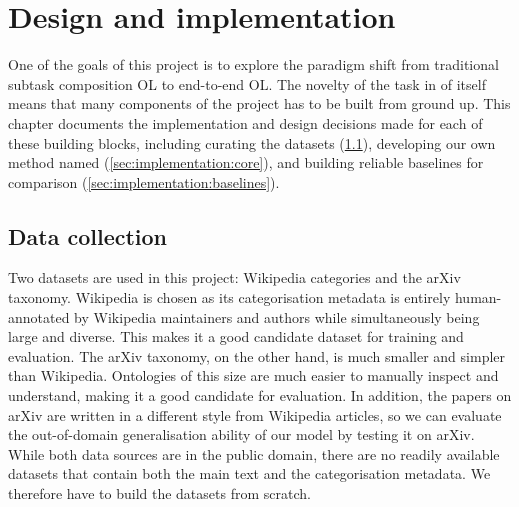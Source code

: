 \chapter{Design and implementation}  \label{chap:implementation}

One of the goals of this project is to explore the paradigm shift from traditional subtask composition OL to end-to-end OL. The novelty of the task in of itself means that many components of the project has to be built from ground up. This chapter documents the implementation and design decisions made for each of these building blocks, including curating the datasets (\cref{sec:implementation:data-collection}), developing our own method named \textbf{\name} (\cref{sec:implementation:core}), and building reliable baselines for comparison (\cref{sec:implementation:baselines}).



\section{Data collection}  \label{sec:implementation:data-collection}

Two datasets are used in this project: Wikipedia categories and the arXiv taxonomy. Wikipedia is chosen as its categorisation metadata is entirely human-annotated by Wiki\-pedia maintainers and authors while simultaneously being large and diverse. This makes it a good candidate dataset for training and evaluation. The arXiv taxonomy, on the other hand, is much smaller and simpler than Wikipedia. Ontologies of this size are much easier to manually inspect and understand, making it a good candidate for evaluation. In addition, the papers on arXiv are written in a different style from Wikipedia articles, so we can evaluate the out-of-domain generalisation ability of our model by testing it on arXiv. While both data sources are in the public domain, there are no readily available datasets that contain both the main text and the categorisation metadata. We therefore have to build the datasets from scratch.

